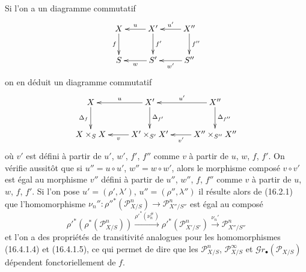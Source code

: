 \begin{env}[16.4.2]
\label{IV.16.4.2}
Si l'on a un diagramme commutatif
\[
  \xymatrix{
    X \ar[d]_-{f} & X' \ar[l]_-u \ar[d]^-{f'} &
      X'' \ar[l]_-{u'} \ar[d]^-{f''} \\
    S & S' \ar[l]^-w & S'' \ar[l]^-{w'}
  }
\]
on en déduit un diagramme commutatif
\[
  \xymatrix{
    X \ar[d]_-{\Delta_f} & X' \ar[l]_-u \ar[d]^-{\Delta_{f'}} &
      X'' \ar[l]_-{u'} \ar[d]^-{\Delta_{f''}} \\
    X\times_S X & X'\times_{S'}X' \ar[l]^-v &
      X''\times_{S''}X'' \ar[l]^-{v'}
  }
\]
où $v'$ est défini à partir de $u'$, $w'$, $f'$, $f''$ comme $v$ à partir de
$u$, $w$, $f$, $f'$. On vérifie aussitôt que si $u''=u\circ u'$,
$w''=w\circ w'$, alors le morphisme composé $v\circ v'$ est égal au morphisme
$v''$ défini à partir de $u''$, $w''$, $f$, $f''$ comme $v$ à partir de $u$,
$w$, $f$, $f'$. Si l'on pose $u'=(\rho',\lambda')$,
$u''=(\rho'',\lambda'')$ il résulte alors de (16.2.1) que l'homomorphisme
$\nu_n'':\rho''^*(\mathscr{P}_{X/S}^n)\to\mathscr{P}_{X''/S''}^n$ est égal au
composé
\[
  \rho'^*(\rho^*(\mathscr{P}_{X/S}^n))
  \xrightarrow{\rho'^*(\nu_n^\#)}
  \rho'^*(\mathscr{P}_{X'/S'}^n)
  \xrightarrow{\nu_n'}\mathscr{P}_{X''/S''}^n
\]
et l'on a des propriétés de transitivité analogues pour les homomorphismes
(16.4.1.4) et (16.4.1.5), ce qui permet de dire que les
$\mathscr{P}_{X/S}^n$, $\mathscr{P}_{X/S}^\infty$ et
$\mathscr{G}r_\bullet(\mathscr{P}_{X/S})$ dépendent fonctoriellement de $f$.
\end{env}

